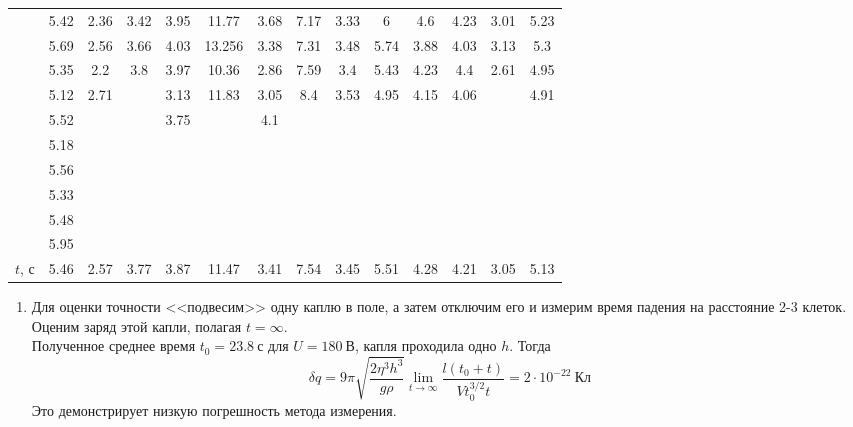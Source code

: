 \documentclass[a4paper,12pt]{article} %
\begin{document}
\begin{table}[h]
\begin{tabular}{|c|c|c|c|c|c|c|c|c|c|c|c|c|c|}
		\multirow{10}{*}{} & 5.42 & 2.36  & 3.42  & 3.95  & 11.77  & 3.68  & 7.17 & 3.33  & 6     & 4.6  & 4.23  & 3.01  & 5.23 \\ \cline{2-14} 
		& 5.69 & 2.56  & 3.66  & 4.03  & 13.256 & 3.38  & 7.31 & 3.48  & 5.74  & 3.88 & 4.03  & 3.13  & 5.3  \\ \cline{2-14} 
		& 5.35 & 2.2   & 3.8   & 3.97  & 10.36  & 2.86  & 7.59 & 3.4   & 5.43  & 4.23 & 4.4   & 2.61  & 4.95 \\ \cline{2-14} 
		& 5.12 & 2.71  &       & 3.13  & 11.83  & 3.05  & 8.4  & 3.53  & 4.95  & 4.15 & 4.06  &       & 4.91 \\ \cline{2-14} 
		& 5.52 &       &       & 3.75  &        & 4.1   &      &       &       &      &       &       &      \\ \cline{2-14} 
		& 5.18 &       &       &       &        &       &      &       &       &      &       &       &      \\ \cline{2-14} 
		& 5.56 &       &       &       &        &       &      &       &       &      &       &       &      \\ \cline{2-14} 
		& 5.33 &       &       &       &        &       &      &       &       &      &       &       &      \\ \cline{2-14} 
		& 5.48 &       &       &       &        &       &      &       &       &      &       &       &      \\ \cline{2-14} 
		& 5.95 &       &       &       &        &       &      &       &       &      &       &       &      \\ \hline
		$t$, с                   & 5.46 & 2.57  & 3.77  & 3.87  & 11.47  & 3.41  & 7.54 & 3.45  & 5.51  & 4.28 & 4.21  & 3.05  & 5.13 \\ \hline
	\end{tabular}
\end{table}
\begin{enumerate}
\item Для оценки точности <<подвесим>> одну каплю в поле, а затем отключим его и измерим время падения на расстояние 2-3 клеток. Оценим заряд этой капли, полагая $t=\infty$.\\
Полученное среднее время $t_0 = 23.8~\text{с}$ для $U = 180~\text{В}$, капля проходила одно $h$. Тогда 
$$
\delta q =9\pi \sqrt{\dfrac{2\eta^3 h^3}{g\rho}} \lim\limits_{t\rightarrow \infty}  \dfrac{l(t_0+t)}{Vt^{3/2}_0t} = 2 \cdot 10^{-22}~\text{Кл}
$$
Это демонстрирует низкую погрешность метода измерения.
\end{enumerate} 
\end{document}
